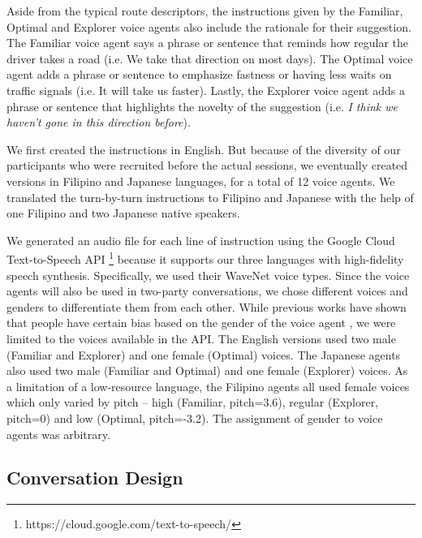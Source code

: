 Aside from the typical route descriptors, the instructions given by the Familiar, Optimal and Explorer voice agents also include the rationale for their suggestion. The Familiar voice agent says a phrase or sentence that reminds how regular the driver takes a road (i.e. We take that direction on most days). The Optimal voice agent adds a phrase or sentence to emphasize fastness or having less waits on traffic signals (i.e. It will take us faster). Lastly, the Explorer voice agent adds a phrase or sentence that highlights the novelty of the suggestion (i.e. \textit{I think we haven't gone in this direction before}). 

We first created the instructions in English. But because of the diversity of our participants who were recruited before the actual sessions, we eventually created versions in Filipino and Japanese languages, for a total of 12 voice agents. We translated the turn-by-turn instructions to Filipino and Japanese with the help of one Filipino and two Japanese native speakers.

We generated an audio file for each line of instruction using the Google Cloud Text-to-Speech API \footnote{https://cloud.google.com/text-to-speech/} because it supports our three languages with high-fidelity speech synthesis. Specifically, we used their WaveNet voice types. Since the voice agents will also be used in two-party conversations, we chose different voices and genders to differentiate them from each other. While previous works have shown that people have certain bias based on the gender of the voice agent \cite{Jeayeol2015}, we were limited to the voices available in the API. The English versions used two male (Familiar and Explorer) and one female (Optimal) voices. The Japanese agents also used two male (Familiar and Optimal) and one female (Explorer) voices. As a limitation of a low-resource language, the Filipino agents all used female voices which only varied by pitch -- high (Familiar, pitch=3.6), regular (Explorer, pitch=0) and low (Optimal, pitch=-3.2). The assignment of gender to voice agents was arbitrary. 

\subsection{Conversation Design}

